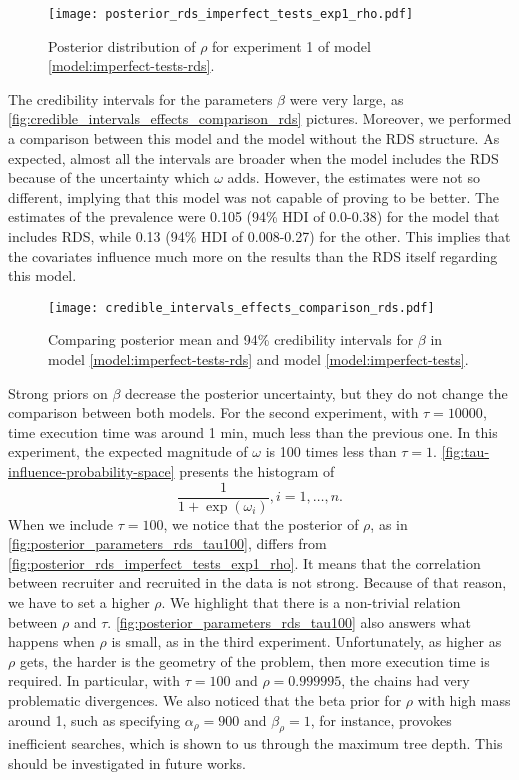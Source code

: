\begin{figure}
  \centering
  \caption{\label{fig:posterior_rds_imperfect_tests_exp1_rho}Posterior distribution of
    $\rho$ for experiment 1 of model \eqref{model:imperfect-tests-rds}.}
  \texttt{[image: posterior\_rds\_imperfect\_tests\_exp1\_rho.pdf]}
\end{figure}

The credibility intervals for the parameters $\beta$ were very large, as
\autoref{fig:credible_intervals_effects_comparison_rds} pictures. Moreover, we
performed
a comparison between this model and the model without the RDS structure. As
expected, almost all the intervals are broader when the model includes the RDS
because of the uncertainty which $\omega$ adds. However, the estimates were
not so different, implying that this model was not capable of proving to be
better. The estimates of the prevalence were 0.105 (94\% HDI of 0.0-0.38) for
the model that includes RDS, while 0.13 (94\% HDI of 0.008-0.27) for the
other. This implies that the covariates influence much more on the results 
than the RDS itself regarding this model. 

\begin{figure}
  \centering
  \caption{\label{fig:credible_intervals_effects_comparison_rds}Comparing
  posterior mean and 94\% credibility intervals for $\beta$ in model
  \eqref{model:imperfect-tests-rds} and model \eqref{model:imperfect-tests}.}
  \texttt{[image: credible\_intervals\_effects\_comparison\_rds.pdf]}
\end{figure}

Strong priors on $\beta$ decrease the posterior uncertainty, but they do not
change the comparison between both models. For the second experiment, with
$\tau = 10000$, time execution time was around 1 min, much less than the
previous one. In this experiment, the expected magnitude of $\omega$ is
100 times less than $\tau = 1$. \autoref{fig:tau-influence-probability-space}
presents the histogram of 
$$
\frac{1}{1 + \exp(\omega_i)}, i = 1, \dots, n.
$$
When we include $\tau = 100$, we notice that the posterior of $\rho$, as in
\autoref{fig:posterior_parameters_rds_tau100}, differs from
\autoref{fig:posterior_rds_imperfect_tests_exp1_rho}. It means that the
correlation between recruiter and recruited in the data is not strong. Because
of that reason, we have to set a higher $\rho$. We highlight that there is a non-trivial
relation between $\rho$ and $\tau$.
\autoref{fig:posterior_parameters_rds_tau100} also answers what happens when
$\rho$ is small, as in the third experiment. Unfortunately, as higher as $\rho$
gets, the harder is the geometry of the problem, then more execution time is
required. In particular, with $\tau = 100$ and $\rho = 0.999995$, the chains
had very problematic divergences. We also noticed that the beta prior for
$\rho$ with high mass around 1, such as specifying $\alpha_{\rho} = 900$ and
$\beta_{\rho} = 1$, for instance, provokes inefficient searches, which is
shown to us through the maximum tree depth. This should be investigated in
future works. 

